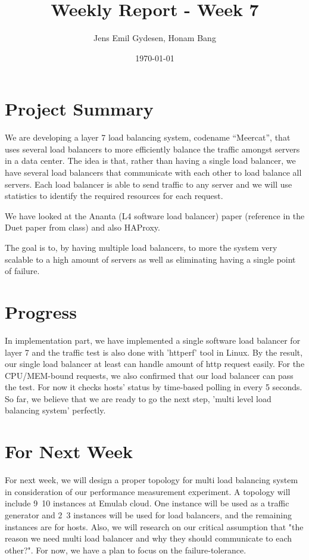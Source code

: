 \documentclass[11pt,letter]{article}
\author{Jens Emil Gydesen, Honam Bang}
\date{\today}
\title{Weekly Report - Week 7}
\begin{document}
\maketitle
\section{Project Summary}
We are developing a layer 7 load balancing system, codename ``Meercat'', that uses several load balancers to more efficiently balance the traffic amongst servers in a data center. The idea is that, rather than having a single load balancer, we have several load balancers that communicate with each other to load balance all servers. Each load balancer is able to send traffic to any server and we will use statistics to identify the required resources for each request.

We have looked at the Ananta (L4 software load balancer) paper (reference in the Duet paper from class)\cite{ananta} and also HAProxy\cite{haproxy}.

The goal is to, by having multiple load balancers, to more the system very scalable to a high amount of servers as well as eliminating having a single point of failure. 

\section{Progress}
In implementation part, we have implemented a single software load balancer for layer 7 and the traffic test is also done with 'httperf' tool in Linux. By the result, our single load balancer at least can handle amount of http request easily. For the CPU/MEM-bound requests, we also confirmed that our load balancer can pass the test. For now it checks hosts' status by time-based polling in every 5 seconds. So far, we believe that we are ready to go the next step, 'multi level load balancing system' perfectly.

\section{For Next Week}
For next week, we will design a proper topology for multi load balancing system in consideration of our performance measurement experiment. A topology will include 9~10 instances at Emulab cloud. One instance will be used as a traffic generator and 2~3 instances will be used for load balancers, and the remaining instances are for hosts. Also, we will research on our critical assumption that "the reason we need multi load balancer and why they should communicate to each other?". For now, we have a plan to focus on the failure-tolerance. 
\end{document}
